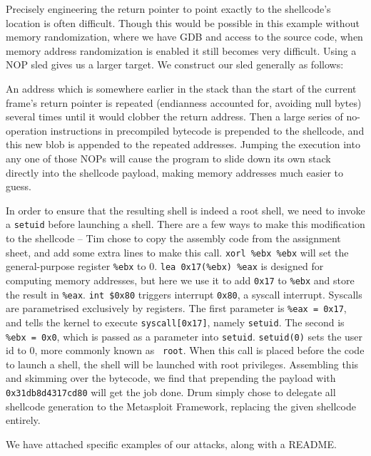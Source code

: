 Precisely engineering the return pointer to point exactly to the shellcode's location is often difficult. Though this
would be possible in this example without memory randomization, where we have GDB and access to the source code, when
memory address randomization is enabled it still becomes very difficult. Using a NOP sled gives us a larger target. We
construct our sled generally as follows:

An address which is somewhere earlier in the stack than the start of the current frame's return pointer is repeated
(endianness accounted for, avoiding null bytes) several times until it would clobber the return address. Then a large
series of no-operation instructions in precompiled bytecode is prepended to the shellcode, and this new blob is appended
to the repeated addresses. Jumping the execution into any one of those NOPs will cause the program to slide down its own
stack directly into the shellcode payload, making memory addresses much easier to guess.

In order to ensure that the resulting shell is indeed a root shell, we need to invoke a {\tt setuid} before launching a
shell. There are a few ways to make this modification to the shellcode -- Tim chose to copy the assembly code from the
assignment sheet, and add some extra lines to make this call. {\tt xorl \%ebx \%ebx} will set the general-purpose
register {\tt \%ebx} to 0. {\tt lea 0x17(\%ebx) \%eax} is designed for computing memory addresses, but here we use it to
add {\tt 0x17} to {\tt \%ebx} and store the result in {\tt \%eax}. {\tt int \$0x80} triggers interrupt {\tt 0x80}, a
syscall interrupt. Syscalls are parametrised exclusively by registers\cite{syscalls}. The first parameter is {\tt \%eax
= 0x17}, and tells the kernel to execute {\tt syscall[0x17]}, namely {\tt setuid}. The second is {\tt \%ebx = 0x0},
which is passed as a parameter into {\tt setuid}. {\tt setuid(0)} sets the user id to 0, more commonly known as {\tt
root}. When this call is placed before the code to launch a shell, the shell will be launched with root privileges.
Assembling this and skimming over the bytecode, we find that prepending the payload with {\tt 0x31db8d4317cd80} will get
the job done. Drum simply chose to delegate all shellcode generation to the Metasploit Framework, replacing the given
shellcode entirely.

We have attached specific examples of our attacks, along with a README.

